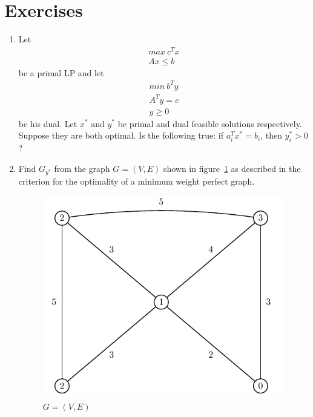 \section*{Exercises} 
\begin{enumerate}
   \item   Let 
           \begin{displaymath}
              \begin{array}{c}
                 max \ c^T x \\
                 Ax \leq b
              \end{array}
           \end{displaymath}
           be a primal LP and let 
           \begin{displaymath}
              \begin{array}{c}
                 min \ b^T y \\
                 A^T y = c \\
                 y \geq 0
              \end{array}
           \end{displaymath}
           be his dual. Let $x^*$ and $y^*$ be primal and dual    
           feasible solutions respectively. Suppose they are
           both optimal. Is the following true: 
           if $a^T_i x^* = b_i$, then $y^*_i > 0$?
           
   \item   Find $G_{y^*}$ from the graph $G=(V,E)$ shown in
           figure~\ref{fig:exgraph} as described in the 
           criterion for the optimality of a minimum
           weight perfect graph.
          
           \begin{figure}[htbp]
             \begin{center}
               \includegraphics{figures/exgraph.pdf}
             \end{center}
               \caption{$G=(V,E)$}
               \label{fig:exgraph} 
           \end{figure} 
           

\end{enumerate}

